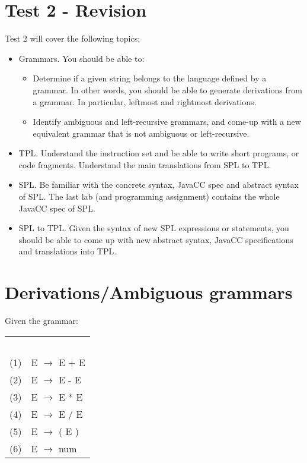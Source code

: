 \documentclass{article}
\begin{document}
\thispagestyle{empty}

\newcommand{\negra}[1]{\textbf{#1}}

\section*{Test 2 - Revision}

\medskip\noindent Test 2 will cover the following topics:

\begin{itemize}
\item Grammars. You should be able to:
\begin{itemize}
\item Determine if a given string belongs to the language defined by a grammar. In other words, you should be able to generate derivations from a grammar. In particular, leftmost and rightmost derivations.
\item Identify ambiguous and left-recursive grammars, and come-up with a new equivalent grammar that is not ambiguous or left-recursive.
\end{itemize}
\item TPL. Understand the instruction set and be able to write short programs, or code fragments. Understand the main translations from SPL to TPL.
\item SPL. Be familiar with the concrete syntax, JavaCC spec and abstract syntax of SPL. The last lab (and programming assignment) contains the whole JavaCC spec of SPL. 
\item SPL to TPL. Given the syntax of new SPL expressions or statements, you should be able to come up with new abstract syntax, JavaCC specifications and translations into TPL.
\end{itemize}

\section{Derivations/Ambiguous grammars}

Given the grammar:

\begin{tabular}{ll}
\ \\
(1)  & E $\rightarrow$ E + E \\
(2)  & E $\rightarrow$ E - E \\
(3)  & E $\rightarrow$ E * E \\
(4)  & E $\rightarrow$ E / E \\
(5)  & E $\rightarrow$ ( E ) \\
(6) &  E $\rightarrow$ num \\
\end{tabular} \\
\end{document}
